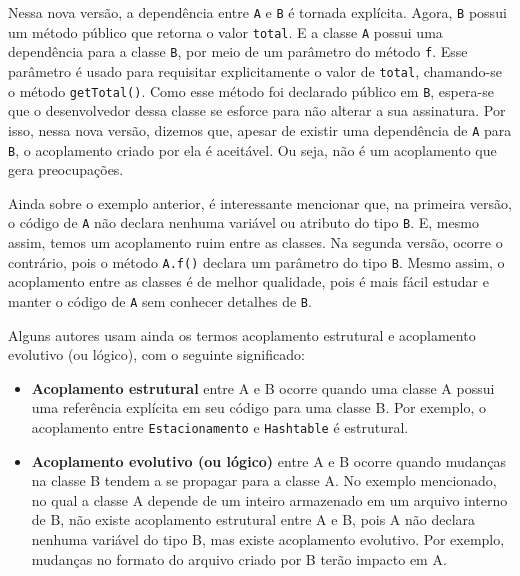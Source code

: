 \documentclass[
  11pt,
  twoside]{book}
\newcommand{\passthrough}[1]{#1}
\begin{document}
Nessa nova versão, a dependência entre \passthrough{\lstinline!A!} e
\passthrough{\lstinline!B!} é tornada explícita. Agora,
\passthrough{\lstinline!B!} possui um método público que retorna o valor
\passthrough{\lstinline!total!}. E a classe \passthrough{\lstinline!A!}
possui uma dependência para a classe \passthrough{\lstinline!B!}, por
meio de um parâmetro do método \passthrough{\lstinline!f!}. Esse
parâmetro é usado para requisitar explicitamente o valor de
\passthrough{\lstinline!total!}, chamando-se o método
\passthrough{\lstinline!getTotal()!}. Como esse método foi declarado
público em \passthrough{\lstinline!B!}, espera-se que o desenvolvedor
dessa classe se esforce para não alterar a sua assinatura. Por isso,
nessa nova versão, dizemos que, apesar de existir uma dependência de
\passthrough{\lstinline!A!} para \passthrough{\lstinline!B!}, o
acoplamento criado por ela é aceitável. Ou seja, não é um acoplamento
que gera preocupações.

Ainda sobre o exemplo anterior, é interessante mencionar que, na
primeira versão, o código de \passthrough{\lstinline!A!} não declara
nenhuma variável ou atributo do tipo \passthrough{\lstinline!B!}. E,
mesmo assim, temos um acoplamento ruim entre as classes. Na segunda
versão, ocorre o contrário, pois o método
\passthrough{\lstinline!A.f()!} declara um parâmetro do tipo
\passthrough{\lstinline!B!}. Mesmo assim, o acoplamento entre as classes
é de melhor qualidade, pois é mais fácil estudar e manter o código de
\passthrough{\lstinline!A!} sem conhecer detalhes de
\passthrough{\lstinline!B!}.

 
 Alguns autores usam ainda os termos
acoplamento estrutural e acoplamento evolutivo (ou lógico), com o
seguinte significado:

\begin{itemize}
\item
  \textbf{Acoplamento estrutural} entre A e B ocorre quando uma classe A
  possui uma referência explícita em seu código para uma classe B. Por
  exemplo, o acoplamento entre \passthrough{\lstinline!Estacionamento!}
  e \passthrough{\lstinline!Hashtable!} é estrutural.
\item
  \textbf{Acoplamento evolutivo (ou lógico)} entre A e B ocorre quando
  mudanças na classe B tendem a se propagar para a classe A. No exemplo
  mencionado, no qual a classe A depende de um inteiro armazenado em um
  arquivo interno de B, não existe acoplamento estrutural entre A e B,
  pois A não declara nenhuma variável do tipo B, mas existe acoplamento
  evolutivo. Por exemplo, mudanças no formato do arquivo criado por B
  terão impacto em A.
\end{itemize}
\end{document}
